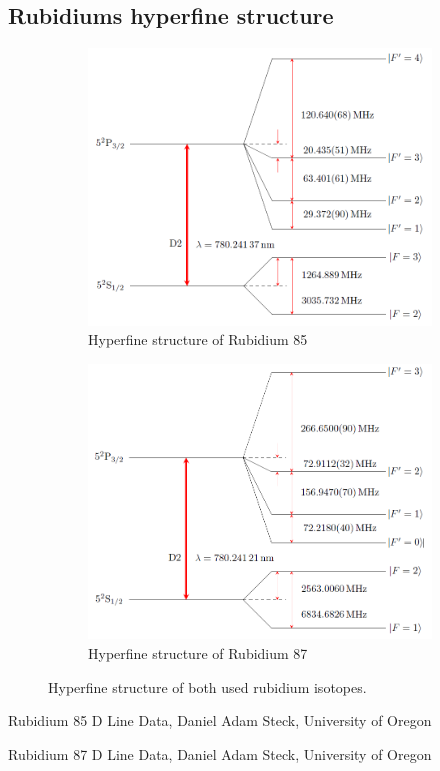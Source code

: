 \documentclass[]{article}
\begin{document}
\subsection{Rubidiums hyperfine structure}
\begin{figure}[H]
\centering
\begin{subfigure}{.8\textwidth}
\centering
\includegraphics[width=1\textwidth]{Plots/Level85.png}
\caption{Hyperfine structure of Rubidium 85 \cite{steck85} }
\end{subfigure}

\begin{subfigure}{.8\textwidth}
\centering
\includegraphics[width=1\textwidth]{Plots/Level87.png}
\caption{Hyperfine structure of Rubidium 87 \cite{steck87}}
\end{subfigure}

\caption{Hyperfine structure of both used rubidium isotopes.}
\label{fig:Rb_hyperfine}
\end{figure}

\newpage
\begin{thebibliography}{}
 Rubidium 85 D Line Data, Daniel Adam Steck, University of Oregon

 Rubidium 87 D Line Data, Daniel Adam Steck, University of Oregon


\end{thebibliography}
\end{document}
